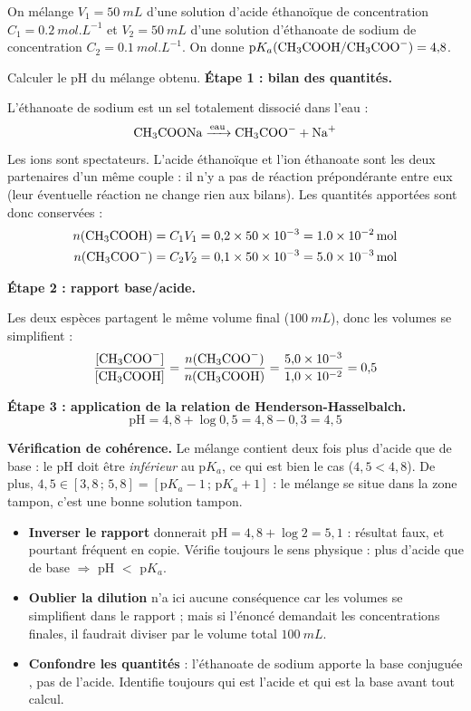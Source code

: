 \documentclass[11pt]{article}
\begin{document}
\begin{exoresolu}
On mélange $V_1 = \SI{50}{mL}$ d'une solution d'acide éthanoïque  de concentration $C_1 = \SI{0,2}{mol.L^{-1}}$ et $V_2 = \SI{50}{mL}$ d'une solution d'éthanoate de sodium  de concentration $C_2 = \SI{0,1}{mol.L^{-1}}$. On donne $\text{p}K_a(\ce{CH3COOH}/\ce{CH3COO-}) = 4{,}8$.

Calculer le pH du mélange obtenu.
\tcblower
\textbf{Étape 1 : bilan des quantités.}

L'éthanoate de sodium est un sel totalement dissocié dans l'eau :
\[ \ce{CH3COONa ->[eau] CH3COO- + Na+} \]
Les ions  sont spectateurs. L'acide éthanoïque et l'ion éthanoate sont les deux partenaires d'un même couple : il n'y a pas de réaction prépondérante entre eux (leur éventuelle réaction  ne change rien aux bilans). Les quantités apportées sont donc conservées :
\begin{align*}
n(\ce{CH3COOH}) &= C_1 V_1 = 0{,}2 \times 50 \times 10^{-3} = \SI{1,0e-2}{mol} \\
n(\ce{CH3COO-}) &= C_2 V_2 = 0{,}1 \times 50 \times 10^{-3} = \SI{5,0e-3}{mol}
\end{align*}

\textbf{Étape 2 : rapport base/acide.}

Les deux espèces partagent le même volume final ($\SI{100}{mL}$), donc les volumes se simplifient :
\[ \dfrac{[\ce{CH3COO-}]}{[\ce{CH3COOH}]} = \dfrac{n(\ce{CH3COO-})}{n(\ce{CH3COOH})} = \dfrac{5{,}0 \times 10^{-3}}{1{,}0 \times 10^{-2}} = 0{,}5 \]

\textbf{Étape 3 : application de la relation de Henderson-Hasselbalch.}
\[ \text{pH} = 4{,}8 + \log 0{,}5 = 4{,}8 - 0{,}3 = \boxed{4{,}5} \]

\textbf{Vérification de cohérence.} Le mélange contient deux fois plus d'acide que de base : le pH doit être \emph{inférieur} au p$K_a$, ce qui est bien le cas ($4{,}5 < 4{,}8$). De plus, $4{,}5 \in [3{,}8\,;\,5{,}8] = [\text{p}K_a - 1\,;\,\text{p}K_a + 1]$ : le mélange se situe dans la zone tampon, c'est une bonne solution tampon.
\end{exoresolu}

\begin{attention}
\begin{itemize}
\item \textbf{Inverser le rapport} donnerait $\text{pH} = 4{,}8 + \log 2 = 5{,}1$ : résultat faux, et pourtant fréquent en copie. Vérifie toujours le sens physique : plus d'acide que de base $\Rightarrow$ pH $<$ p$K_a$.
\item \textbf{Oublier la dilution} n'a ici aucune conséquence car les volumes se simplifient dans le rapport ; mais si l'énoncé demandait les concentrations finales, il faudrait diviser par le volume total $\SI{100}{mL}$.
\item \textbf{Confondre les quantités} : l'éthanoate de sodium apporte la base conjuguée , pas de l'acide. Identifie toujours qui est l'acide et qui est la base avant tout calcul.
\end{itemize}
\end{attention}
\end{document}

